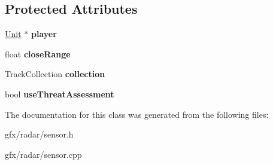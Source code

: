 \subsection*{Protected Attributes}
\begin{DoxyCompactItemize}
\item 
\hyperlink{classUnit}{Unit} $\ast$ {\bfseries player}\hypertarget{classRadar_1_1Sensor_a6c0dae829af83e744ef1c6d011a7ffcc}{}\label{classRadar_1_1Sensor_a6c0dae829af83e744ef1c6d011a7ffcc}

\item 
float {\bfseries close\+Range}\hypertarget{classRadar_1_1Sensor_ac469dfa76e765fded149c34afdf879dc}{}\label{classRadar_1_1Sensor_ac469dfa76e765fded149c34afdf879dc}

\item 
Track\+Collection {\bfseries collection}\hypertarget{classRadar_1_1Sensor_a2cf4b03e7f797d76711cf32dc7b8c1e1}{}\label{classRadar_1_1Sensor_a2cf4b03e7f797d76711cf32dc7b8c1e1}

\item 
bool {\bfseries use\+Threat\+Assessment}\hypertarget{classRadar_1_1Sensor_a275169e5d9404acb5867c990553d483b}{}\label{classRadar_1_1Sensor_a275169e5d9404acb5867c990553d483b}

\end{DoxyCompactItemize}


The documentation for this class was generated from the following files\+:\begin{DoxyCompactItemize}
\item 
gfx/radar/sensor.\+h\item 
gfx/radar/sensor.\+cpp\end{DoxyCompactItemize}
